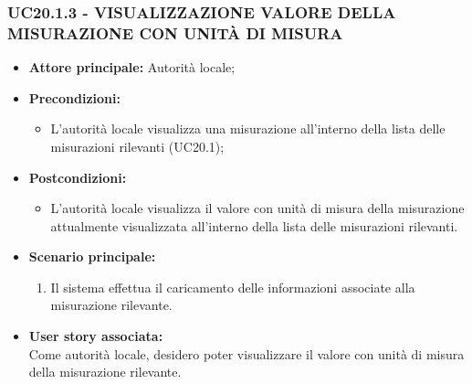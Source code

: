 \subsubsection{UC20.1.3 - VISUALIZZAZIONE VALORE DELLA MISURAZIONE CON UNITÀ DI MISURA}
\begin{itemize}
    \item \textbf{Attore principale:} Autorità locale;
    \item \textbf{Precondizioni:}
        \begin{itemize}
                \item L'autorità locale visualizza una misurazione all'interno della lista delle misurazioni rilevanti (UC20.1);
        \end{itemize}
    \item \textbf{Postcondizioni:}
        \begin{itemize}
            \item L'autorità locale visualizza il valore con unità di misura della misurazione attualmente visualizzata all'interno della lista delle misurazioni rilevanti.
        \end{itemize}
    \item \textbf{Scenario principale:}
        \begin{enumerate}
            \item Il sistema effettua il caricamento delle informazioni associate alla misurazione rilevante.
        \end{enumerate}
    \item \textbf{User story associata:} \\
    Come autorità locale, desidero poter visualizzare il valore con unità di misura della misurazione rilevante.
\end{itemize}